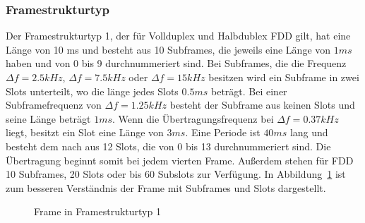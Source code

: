 \subsubsection{Framestrukturtyp}
Der Framestrukturtyp 1, der für Vollduplex und Halbdublex FDD gilt, hat eine Länge von 10 ms und besteht aus 10 Subframes, die jeweils eine Länge von $1ms$ haben und von 0 bis 9 durchnummeriert sind. Bei Subframes, die die Frequenz $\Delta f=2.5kHz$, $\Delta f=7.5kHz$ oder $\Delta f=15kHz$ besitzen wird ein Subframe in zwei Slots unterteilt, wo die länge jedes Slots $0.5ms$ beträgt. Bei einer Subframefrequenz von $\Delta f=1.25kHz$ besteht der Subframe aus keinen Slots und seine Länge beträgt $1ms$. Wenn die Übertragungsfrequenz bei $\Delta f=0.37kHz$ liegt, besitzt ein Slot eine Länge von $3ms$. Eine Periode ist $40ms$ lang und besteht dem nach aus 12 Slots, die von 0 bis 13 durchnummeriert sind. Die Übertragung beginnt somit bei jedem vierten Frame. Außerdem stehen für FDD 10 Subframes, 20 Slots oder bis 60 Subslots zur Verfügung. In Abbildung~\ref{fig:LTE_frame} ist zum besseren Verständnis der Frame mit Subframes und Slots dargestellt. 



\begin{figure}
    \centering
    \caption{Frame in Framestrukturtyp 1}\label{fig:LTE_frame}
\end{figure}

